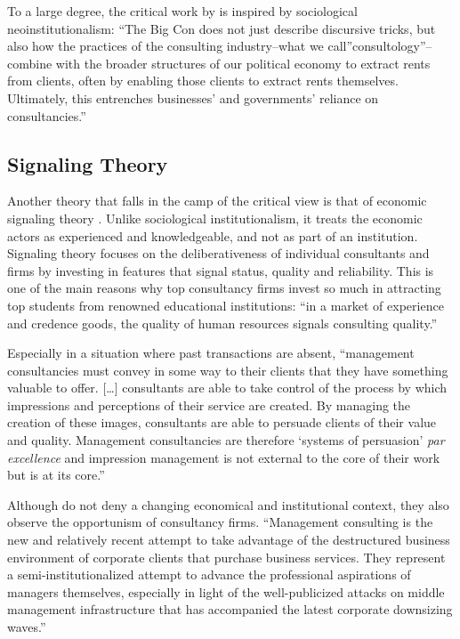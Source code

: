 \documentclass[12pt]{article}
\begin{document}
To a large degree, the critical work by \citet[120]{mazzucato2023} is
inspired by sociological neoinstitutionalism: ``The Big Con does not
just describe discursive tricks, but also how the practices of the
consulting industry--what we call''consultology''--combine with the
broader structures of our political economy to extract rents from
clients, often by enabling those clients to extract rents themselves.
Ultimately, this entrenches businesses' and governments' reliance on
consultancies.''

\subsection{Signaling Theory}\label{signaling-theory}

Another theory that falls in the camp of the critical view is that of
economic signaling theory \citep[ 8-10]{armbruster2006}. Unlike
sociological institutionalism, it treats the economic actors as
experienced and knowledgeable, and not as part of an institution.
Signaling theory focuses on the deliberativeness of individual
consultants and firms by investing in features that signal status,
quality and reliability. This is one of the main reasons why top
consultancy firms invest so much in attracting top students from
renowned educational institutions: ``in a market of experience and
credence goods, the quality of human resources signals consulting
quality.'' \citep[ 178]{armbruster2006}

Especially in a situation where past transactions are absent,
``management consultancies must convey in some way to their clients that
they have something valuable to offer. {[}\ldots{]} consultants are able
to take control of the process by which impressions and perceptions of
their service are created. By managing the creation of these images,
consultants are able to persuade clients of their value and quality.
Management consultancies are therefore `systems of persuasion' \emph{par
excellence} and impression management is not external to the core of
their work but is at its core.'' \citep[ 35]{clark1998}

Although \citet[35]{leicht2006} do not deny a changing economical and
institutional context, they also observe the opportunism of consultancy
firms. ``Management consulting is the new and relatively recent attempt
to take advantage of the destructured business environment of corporate
clients that purchase business services. They represent a
semi-institutionalized attempt to advance the professional aspirations
of managers themselves, especially in light of the well-publicized
attacks on middle management infrastructure that has accompanied the
latest corporate downsizing waves.''
\end{document}
